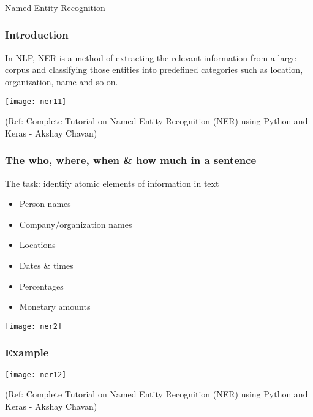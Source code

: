 \begin{frame}[fragile]\frametitle{}

\begin{center}
{\Large Named Entity Recognition}
\end{center}
\end{frame}

\begin{frame}[fragile]\frametitle{Introduction}
In NLP, NER is a method of extracting the relevant information from a large corpus and classifying those entities into predefined categories such as location, organization, name and so on.

  \begin{center}
\texttt{[image: ner11]}
\end{center}


	{\tiny (Ref: Complete Tutorial on Named Entity Recognition (NER) using Python and Keras - Akshay Chavan)}
\end{frame}




\begin{frame}[fragile]\frametitle{The who, where, when \& how much in a sentence}
The task: identify atomic elements of information in text
  \begin{itemize}
  \item Person names
  \item Company/organization names
  \item Locations
  \item Dates \& times
  \item Percentages
  \item Monetary amounts
  \end{itemize}
  \begin{center}
\texttt{[image: ner2]}
\end{center}
\end{frame}


\begin{frame}[fragile]\frametitle{Example}

  \begin{center}
\texttt{[image: ner12]}
\end{center}


	{\tiny (Ref: Complete Tutorial on Named Entity Recognition (NER) using Python and Keras - Akshay Chavan)}
\end{frame}



